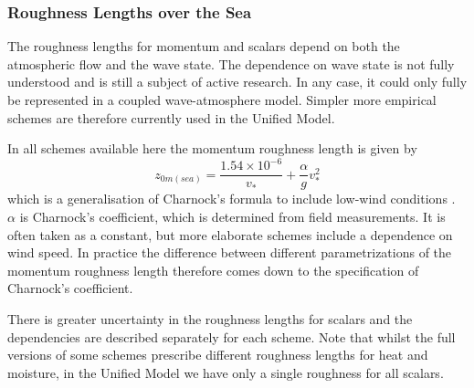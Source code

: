 \documentclass{UMDP_article}
\begin{document}
\subsubsection{Roughness Lengths over the Sea}

The roughness lengths for momentum and scalars depend on both the
atmospheric flow and the wave state. The dependence on wave state is
not fully understood and is still a subject of active research. In any
case, it could only fully be represented in a coupled wave-atmosphere
model. Simpler more empirical schemes are therefore currently used in
the Unified Model.

In all schemes available here the momentum roughness length is given by
\begin{equation}
  z_{0m(sea)} = \frac{1.54\times  {10}^{-6} }{ v_\ast } + 
  \frac{\alpha}{g}  v_\ast ^2 
  \label{eq:z0msea}
\end{equation}
which is a generalisation of Charnock's formula to include low-wind
conditions \cite[]{Smith88}. $\alpha$ is Charnock's coefficient, which
is determined from field measurements. It is often taken as a
constant, but more elaborate schemes include a dependence on wind
speed. In practice the difference between different parametrizations
of the momentum roughness length therefore comes down to the
specification of Charnock's coefficient.

There is greater uncertainty in the roughness lengths for scalars and
the dependencies are described separately for each scheme. Note that
whilst the full versions of some schemes prescribe different roughness
lengths for heat and moisture, in the Unified Model we have only a
single roughness for all scalars.
\end{document}
